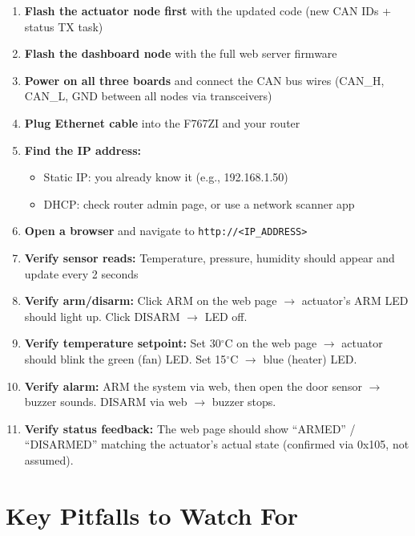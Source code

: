 \documentclass[11pt,a4paper]{article}
\begin{document}
\begin{enumerate}[leftmargin=2em]
  \item \textbf{Flash the actuator node first} with the updated code (new CAN IDs + status TX task)
  \item \textbf{Flash the dashboard node} with the full web server firmware
  \item \textbf{Power on all three boards} and connect the CAN bus wires (CAN\_H, CAN\_L, GND between all nodes via transceivers)
  \item \textbf{Plug Ethernet cable} into the F767ZI and your router
  \item \textbf{Find the IP address:}
  \begin{itemize}
    \item Static IP: you already know it (e.g., 192.168.1.50)
    \item DHCP: check router admin page, or use a network scanner app
  \end{itemize}
  \item \textbf{Open a browser} and navigate to \texttt{http://<IP\_ADDRESS>}
  \item \textbf{Verify sensor reads:} Temperature, pressure, humidity should appear and update every 2 seconds
  \item \textbf{Verify arm/disarm:} Click ARM on the web page $\rightarrow$ actuator's ARM LED should light up. Click DISARM $\rightarrow$ LED off.
  \item \textbf{Verify temperature setpoint:} Set 30$^\circ$C on the web page $\rightarrow$ actuator should blink the green (fan) LED. Set 15$^\circ$C $\rightarrow$ blue (heater) LED.
  \item \textbf{Verify alarm:} ARM the system via web, then open the door sensor $\rightarrow$ buzzer sounds. DISARM via web $\rightarrow$ buzzer stops.
  \item \textbf{Verify status feedback:} The web page should show ``ARMED'' / ``DISARMED'' matching the actuator's actual state (confirmed via 0x105, not assumed).
\end{enumerate}

\newpage

\section{Key Pitfalls to Watch For}
\end{document}
